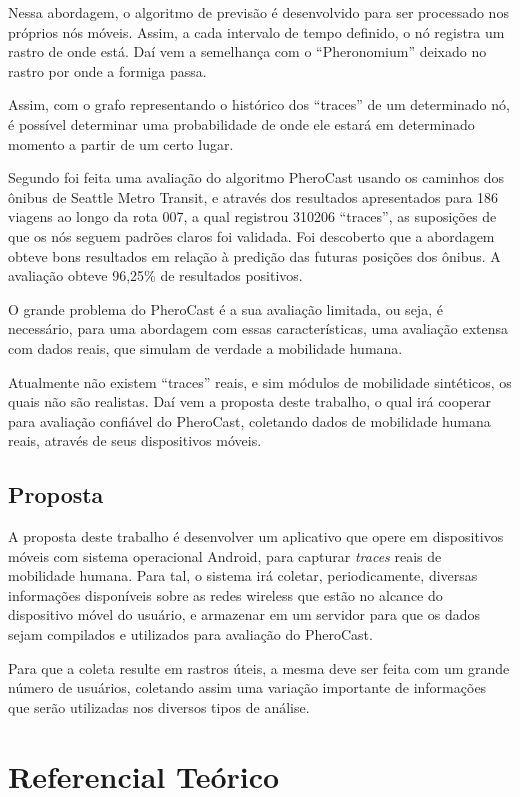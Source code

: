 \documentclass[12pt, %
openright, 
oneside,
a4paper,
brazil]{facom-ufu-abntex2}
\begin{document}
Nessa abordagem, o algoritmo de previsão é desenvolvido para ser processado nos próprios nós móveis. Assim, a cada intervalo de tempo definido, o nó registra um rastro de onde está. Daí vem a semelhança com o ``Pheronomium'' deixado no rastro por onde a formiga passa.

Assim, com o grafo representando o histórico dos ``traces'' de um determinado nó, é possível determinar uma probabilidade de onde ele estará em determinado momento a partir de um certo lugar.


Segundo \cite{fynn} foi feita uma avaliação do algoritmo PheroCast usando os caminhos dos ônibus de Seattle Metro Transit, e através dos resultados apresentados para 186 viagens ao longo da rota 007, a qual registrou 310206 ``traces'', as suposições de que os nós seguem padrões claros foi validada. Foi descoberto que a abordagem obteve bons resultados em relação à predição das futuras posições dos ônibus. A avaliação obteve 96,25\% de resultados positivos. 


O grande problema do PheroCast é a sua avaliação limitada, ou seja, é necessário, para uma abordagem com essas características, uma avaliação extensa com dados reais, que simulam de verdade a mobilidade humana. 

Atualmente não existem ``traces'' reais, e sim módulos de mobilidade sintéticos, os quais não são realistas. Daí vem a proposta deste trabalho, o qual irá cooperar para avaliação confiável do PheroCast, coletando dados de mobilidade humana reais, através de seus dispositivos móveis.

\section{Proposta}
A proposta deste trabalho é desenvolver um aplicativo que opere em dispositivos móveis com sistema operacional Android, para capturar \emph{traces} reais de mobilidade humana. Para tal, o sistema irá coletar, periodicamente, diversas informações disponíveis sobre as redes wireless que estão no alcance do dispositivo móvel do usuário, e armazenar em um servidor para que os dados sejam compilados e utilizados para avaliação do PheroCast.

Para que a coleta resulte em rastros úteis, a mesma deve ser feita com um grande número de usuários, coletando assim uma variação importante de informações que serão utilizadas nos diversos tipos de análise. 


\chapter{Referencial Teórico}
\end{document}

